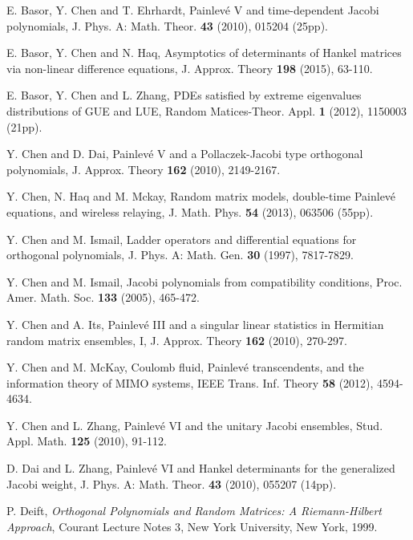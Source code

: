 \documentclass[12pt,a4paper]{article}    %
\numberwithin{equation}{section}
\begin{document}
	\begin{thebibliography}{}

E. Basor, Y. Chen and T. Ehrhardt,  Painlev\'e V and time-dependent Jacobi polynomials, J. Phys. A: Math. Theor. {\bf 43} (2010), 015204 (25pp).

E. Basor, Y. Chen and N. Haq,  Asymptotics of determinants of Hankel matrices
 via non-linear difference equations, J. Approx. Theory {\bf 198} (2015), 63-110.

E. Basor, Y. Chen and L. Zhang, PDEs satisfied by extreme eigenvalues distributions of GUE and LUE, Random Matices-Theor. Appl. {\bf 1} (2012), 1150003 (21pp).

Y. Chen and D. Dai,  Painlev\'e V and a Pollaczek-Jacobi type orthogonal
 polynomials, J. Approx. Theory {\bf 162} (2010), 2149-2167.


 Y. Chen, N. Haq and M. Mckay, Random matrix models, double-time Painlev\'{e} equations, and wireless relaying, J. Math. Phys. {\bf 54} (2013), 063506 (55pp).

Y. Chen and M. Ismail, Ladder operators and differential equations for orthogonal polynomials, J. Phys. A: Math. Gen. {\bf 30} (1997), 7817-7829.
		
{Y. Chen and M. Ismail}, Jacobi polynomials from compatibility conditions, Proc. Amer. Math. Soc. {\bf 133} ({2005}), {465-472}.
		
		{Y. Chen and A. Its},  Painlev\'e III and a singular linear statistics in Hermitian random matrix ensembles, I,  J. Approx. Theory {\bf 162} ({2010}), {270-297}.

 Y. Chen and M. McKay, Coulomb fluid, Painlev\'e transcendents, and the information
 theory of MIMO systems, IEEE Trans. Inf. Theory {\bf 58} (2012), 4594-4634.

Y. Chen and L. Zhang, Painlev\'{e} VI and the unitary Jacobi ensembles,  Stud. Appl. Math. {\bf 125} (2010), 91-112.

D. Dai and L. Zhang, Painlev\'e VI and Hankel determinants for the generalized Jacobi weight,  J. Phys. A: Math. Theor. {\bf 43} (2010), 055207 (14pp).

		
		{P. Deift}, {\em Orthogonal Polynomials and Random Matrices: A Riemann-Hilbert Approach}, {Courant Lecture Notes 3}, {New York University}, {New York}, {1999}.
		

\end{thebibliography}
\end{document}
